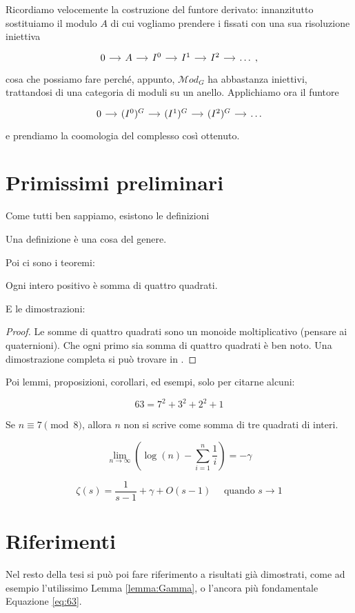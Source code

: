 Ricordiamo velocemente la costruzione del funtore derivato: innanzitutto sostituiamo il modulo $ A $ di cui vogliamo prendere i fissati con una sua risoluzione iniettiva
\[\begin{tikzcd}[column sep = small]
0 \rar & A \rar & I^0 \rar & I^1 \rar & I^2 \rar & \dots \; ,
\end{tikzcd}\]
cosa che possiamo fare perché, appunto, $ \mathcal{M}od_G $ ha abbastanza iniettivi, trattandosi di una categoria di moduli su un anello. Applichiamo ora il funtore
\[\begin{tikzcd}[column sep = small]
0 \rar & (I^0)^G \rar & (I^1)^G \rar & (I^2)^G \rar & \dots
\end{tikzcd}\]
e prendiamo la coomologia del complesso così ottenuto.

\newpage
\section{Primissimi preliminari}

Come tutti ben sappiamo, esistono le definizioni
\begin{definition}
Una definizione è una cosa del genere.
\end{definition}

Poi ci sono i teoremi:
\begin{theorem}
Ogni intero positivo è somma di quattro quadrati.
\end{theorem}

E le dimostrazioni:
\begin{proof}
Le somme di quattro quadrati sono un monoide moltiplicativo (pensare ai quaternioni). Che ogni primo sia somma di quattro quadrati è ben noto. Una dimostrazione completa si può trovare in \cite[Teorema 2.3]{ArticoloFondamentale}.
\end{proof}

Poi lemmi, proposizioni, corollari, ed esempi, solo per citarne alcuni:

\begin{example}
\begin{equation}\label{eq:63}
63=7^2+3^2+2^2+1
\end{equation}
\end{example}
\begin{proposition}
Se $n \equiv 7 \pmod 8$, allora $n$ non si scrive come somma di tre quadrati di interi.
\end{proposition}
\begin{lemma}\label{lemma:Gamma}
\[
\lim_{n \to \infty} \left( \log(n) - \sum_{i=1}^n \frac{1}{i} \right)= -\gamma
\]
\end{lemma}
\begin{corollary}
\[
\zeta(s) = \frac{1}{s-1} + \gamma + O(s-1) \quad \text{ quando } s \to 1
\]
\end{corollary}

\section{Riferimenti}
Nel resto della tesi si può poi fare riferimento a risultati già dimostrati, come ad esempio l'utilissimo Lemma \ref{lemma:Gamma}, o l'ancora più fondamentale Equazione \eqref{eq:63}.